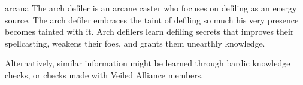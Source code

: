 {}
{arcana}
{The arch defiler is an arcane caster who focuses on defiling as an energy source.}
{The arch defiler embraces the taint of defiling so much his very presence becomes tainted with it.}
{Arch defilers learn defiling secrets that improves their spellcasting, weakens their foes, and grants them unearthly knowledge.}

Alternatively, similar information might be learned through bardic knowledge checks, or  checks made with Veiled Alliance members.